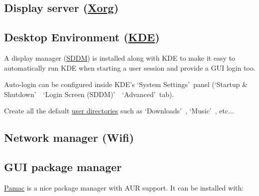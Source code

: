\subsection{Display server (\href{https://wiki.archlinux.org/index.php/xorg}{Xorg})}


\subsection{Desktop Environment (\href{https://wiki.archlinux.org/index.php/KDE}{KDE})}

A display manager (\href{https://wiki.archlinux.org/index.php/SDDM}{SDDM}) is installed along with KDE to make it easy to automatically run KDE when starting a user session and provide a GUI login too.


Auto-login can be configured inside KDE's \lq System Settings\rq\ panel (\lq Startup \& Shutdown\rq\ \rightarrow\ \lq Login Screen (SDDM)\rq\ \rightarrow\ \lq Advanced\rq\ tab).

\begin{blocksection}
	Create all the default \href{https://wiki.archlinux.org/index.php/XDG_user_directories}{user directories} such as \lq Downloads\rq\ , \lq Music\rq\  , etc...
\end{blocksection}

\subsection{Network manager (Wifi)}

\subsection{GUI package manager}

\href{https://wiki.manjaro.org/index.php?title=Pamac}{Pamac} is a nice package manager with AUR support. It can be installed with:


